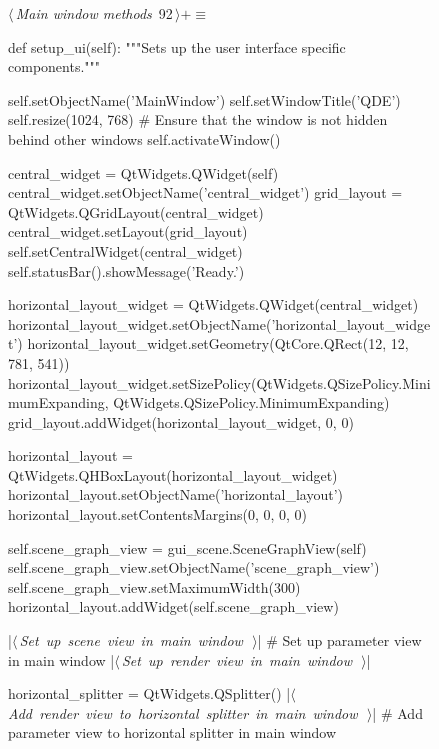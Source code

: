 \documentclass[%
    a4paper,    %
    justified,  %
    nobib,      %
    openany     %
]{tufte-book}
\makeatletter
\renewcommand{\label}[1]{\@tufte@label{##1}}%
\makeatother
\begin{document}
\begin{figure}[!htpb]
\begin{flushleft} \small
\begin{minipage}{\linewidth}\label{scrap20}\raggedright\small
{} $\langle\,${\itshape Main window methods}\nobreak\ {\footnotesize {92}}$\,\rangle+\equiv$
\vspace{-1ex}
\begin{pythoncode}
def setup_ui(self):
    """Sets up the user interface specific components."""

    self.setObjectName('MainWindow')
    self.setWindowTitle('QDE')
    self.resize(1024, 768)
    # Ensure that the window is not hidden behind other windows
    self.activateWindow()

    central_widget = QtWidgets.QWidget(self)
    central_widget.setObjectName('central_widget')
    grid_layout = QtWidgets.QGridLayout(central_widget)
    central_widget.setLayout(grid_layout)
    self.setCentralWidget(central_widget)
    self.statusBar().showMessage('Ready.')

    horizontal_layout_widget = QtWidgets.QWidget(central_widget)
    horizontal_layout_widget.setObjectName('horizontal_layout_widget')
    horizontal_layout_widget.setGeometry(QtCore.QRect(12, 12, 781, 541))
    horizontal_layout_widget.setSizePolicy(QtWidgets.QSizePolicy.MinimumExpanding,
    QtWidgets.QSizePolicy.MinimumExpanding)
    grid_layout.addWidget(horizontal_layout_widget, 0, 0)

    horizontal_layout = QtWidgets.QHBoxLayout(horizontal_layout_widget)
    horizontal_layout.setObjectName('horizontal_layout')
    horizontal_layout.setContentsMargins(0, 0, 0, 0)

    self.scene_graph_view = gui_scene.SceneGraphView(self)
    self.scene_graph_view.setObjectName('scene_graph_view')
    self.scene_graph_view.setMaximumWidth(300)
    horizontal_layout.addWidget(self.scene_graph_view)

    |\hbox{$\langle\,${\itshape Set up scene view in main window}\nobreak\ {\footnotesize {}}$\,\rangle$}|
    # Set up parameter view in main window
    |\hbox{$\langle\,${\itshape Set up render view in main window}\nobreak\ {\footnotesize {}}$\,\rangle$}|

    horizontal_splitter = QtWidgets.QSplitter()
    |\hbox{$\langle\,${\itshape Add render view to horizontal splitter in main window}\nobreak\ {\footnotesize {}}$\,\rangle$}|
    # Add parameter view to horizontal splitter in main window


\end{pythoncode}
\end{minipage}
\end{flushleft}
\end{figure}
\end{document}
